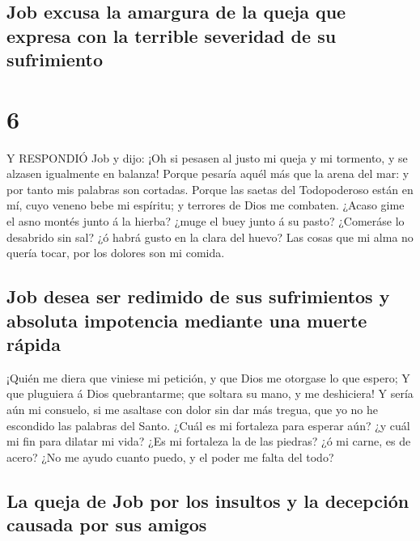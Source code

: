 \hypertarget{job-excusa-la-amargura-de-la-queja-que-expresa-con-la-terrible-severidad-de-su-sufrimiento}{%
\subsection{Job excusa la amargura de la queja que expresa con la
terrible severidad de su
sufrimiento}\label{job-excusa-la-amargura-de-la-queja-que-expresa-con-la-terrible-severidad-de-su-sufrimiento}}

\hypertarget{section-5}{%
\section{6}\label{section-5}}

 Y RESPONDIÓ Job y dijo:  ¡Oh si pesasen al
justo mi queja y mi tormento, y se alzasen igualmente en balanza!
 Porque pesaría aquél más que la arena del mar: y por tanto
mis palabras son cortadas.  Porque las saetas del
Todopoderoso están en mí, cuyo veneno bebe mi espíritu; y terrores de
Dios me combaten.  ¿Acaso gime el asno montés junto á la
hierba? ¿muge el buey junto á su pasto?  ¿Comeráse lo
desabrido sin sal? ¿ó habrá gusto en la clara del huevo? 
Las cosas que mi alma no quería tocar, por los dolores son mi comida.

\hypertarget{job-desea-ser-redimido-de-sus-sufrimientos-y-absoluta-impotencia-mediante-una-muerte-ruxe1pida}{%
\subsection{Job desea ser redimido de sus sufrimientos y absoluta
impotencia mediante una muerte
rápida}\label{job-desea-ser-redimido-de-sus-sufrimientos-y-absoluta-impotencia-mediante-una-muerte-ruxe1pida}}

 ¡Quién me diera que viniese mi petición, y que Dios me
otorgase lo que espero;  Y que pluguiera á Dios
quebrantarme; que soltara su mano, y me deshiciera!  Y
sería aún mi consuelo, si me asaltase con dolor sin dar más tregua, que
yo no he escondido las palabras del Santo.  ¿Cuál es mi
fortaleza para esperar aún? ¿y cuál mi fin para dilatar mi vida?
 ¿Es mi fortaleza la de las piedras? ¿ó mi carne, es de
acero?  ¿No me ayudo cuanto puedo, y el poder me falta del
todo?

\hypertarget{la-queja-de-job-por-los-insultos-y-la-decepciuxf3n-causada-por-sus-amigos}{%
\subsection{La queja de Job por los insultos y la decepción causada por
sus
amigos}\label{la-queja-de-job-por-los-insultos-y-la-decepciuxf3n-causada-por-sus-amigos}}

